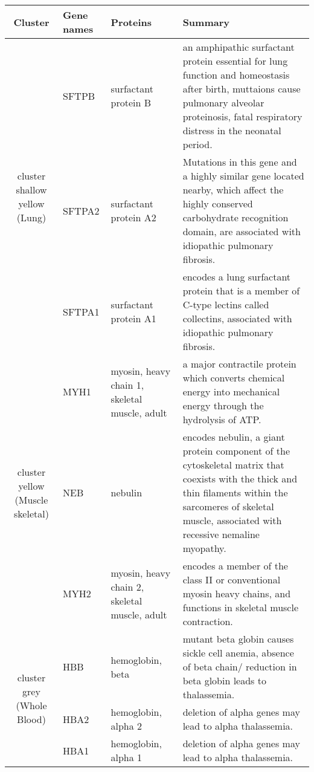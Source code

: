 \newpage
\begin{table}
\begin{center}
\begin{tabular}{|c|p{0.5in}|p{1.4in}|p{3.6in}|}
\hline
Cluster & Gene names & Proteins  & Summary \\
\hline
\multirow{3}{4em}{\small{cluster shallow yellow (Lung)}} & \small{SFTPB} & \footnotesize{surfactant protein B} & \scriptsize {an amphipathic surfactant protein essential for lung function and homeostasis after birth, muttaions cause pulmonary alveolar proteinosis, fatal respiratory distress in the neonatal period.} \\
 					    & \small{SFTPA2} & \footnotesize{surfactant protein A2} & \scriptsize{Mutations in this gene and a highly similar gene located nearby, which affect the highly conserved carbohydrate recognition domain, are associated with idiopathic pulmonary fibrosis.} \\
					    & \small{SFTPA1} & \footnotesize{surfactant protein A1} &  \scriptsize{encodes a lung surfactant protein that is a member of C-type lectins called collectins, associated with idiopathic pulmonary fibrosis.} \\
\hline				   
 \multirow{3}{4em}{\small{cluster yellow (Muscle skeletal)}} & \small{MYH1} & \footnotesize{myosin, heavy chain 1, skeletal muscle, adult }& \scriptsize{a major contractile protein which converts chemical energy into mechanical energy through the hydrolysis of ATP.} \\
 					    & \small{NEB} & \footnotesize{nebulin} & \scriptsize{encodes nebulin, a giant protein component of the cytoskeletal matrix that coexists with the thick and thin filaments within the sarcomeres of skeletal muscle, associated with recessive nemaline myopathy.} \\
					    & \small{MYH2} & \footnotesize{myosin, heavy chain 2, skeletal muscle, adult} & \scriptsize{encodes a member of the class II or conventional myosin heavy chains, and functions in skeletal muscle contraction.} \\
\hline					    
 \multirow{3}{4em}{\small{cluster grey (Whole Blood)}} & \small{HBB} & \footnotesize{hemoglobin, beta} & \scriptsize{mutant beta globin causes sickle cell anemia, absence of beta chain/ reduction in beta globin leads to thalassemia.}\\
 					      & \small{HBA2} & \footnotesize{hemoglobin, alpha 2} & \scriptsize{deletion of alpha genes may lead to alpha thalassemia.}  \\
					      & \small{HBA1} & \footnotesize{hemoglobin, alpha 1} & \scriptsize{deletion of alpha genes may lead to alpha thalassemia.}  \\
\hline				      


\end{tabular}
\end{center}
\end{table}
